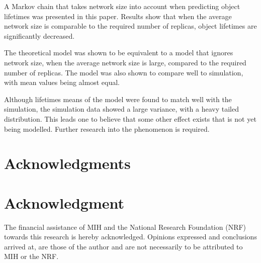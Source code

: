 \documentclass[10pt,a4paper,conference]{IEEEtran}
\begin{document}
A Markov chain that takes network size into account when predicting object lifetimes was presented in this paper. Results show that when the average network size is comparable to the required number of replicas, object lifetimes are significantly decreased.

The theoretical model was shown to be equivalent to a model that ignores network size, when the average network size is large, compared to the required number of replicas. The model was also shown to compare well to simulation, with mean values being almost equal.

Although lifetimes means of the model were found to match well with the simulation, the simulation data showed a large variance, with a heavy tailed distribution. This leads one to believe that some other effect exists that is not yet being modelled. Further research into the phenomenon is required.


\ifCLASSOPTIONcompsoc
  \section*{Acknowledgments}
\else
  \section*{Acknowledgment}
\fi

The financial assistance of MIH and the National Research Foundation (NRF) towards this research is hereby acknowledged. Opinions expressed and
conclusions arrived at, are those of the author and are not necessarily to be attributed to MIH or the NRF.




\end{document}
